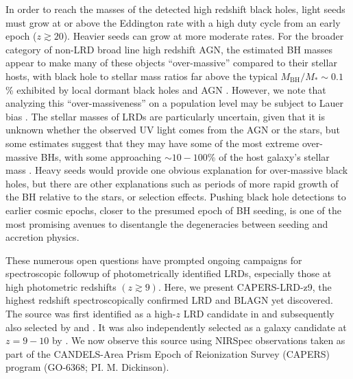 \documentclass[twocolumn]{aastex7}
\newcommand{\src}{CAPERS-LRD-z9}
\begin{document}
In order to reach the masses of the detected high redshift black holes, light seeds must grow at or above the Eddington rate with a high duty cycle from an early epoch ($z\gtrsim 20$). Heavier seeds can grow at more moderate rates. For the broader category of non-LRD broad line high redshift AGN, the estimated BH masses appear to make many of these objects ``over-massive'' compared to their stellar hosts, with black hole to stellar mass ratios far above the typical $M_{\textrm{BH}}/M_*\sim0.1$\% exhibited by local dormant black holes and AGN \citep{agarwal13,pacucci23}. However, we note that analyzing this ``over-massiveness'' on a population level may be subject to Lauer bias \citep[the tendency to observe a greater number of massive black holes as outliers in intrinsically common moderate mass galaxies, rather than in intrinsically rarer high-mass galaxies;][]{lauer07,lisilverman25}. The stellar masses of LRDs are particularly uncertain, given that it is unknown whether the observed UV light comes from the AGN or the stars, but some estimates suggest that they may have some of the most extreme over-massive BHs, with some approaching $\sim10-100$\% of the host galaxy's stellar mass \citep[e.g.][]{Maiolino_2023,kokorev23,kocevski25,Chen_2025}. Heavy seeds would provide one obvious explanation for over-massive black holes, but there are other explanations such as periods of more rapid growth of the BH relative to the stars, or selection effects. Pushing black hole detections to earlier cosmic epochs, closer to the presumed epoch of BH seeding, is one of the most promising avenues to disentangle the degeneracies between seeding and accretion physics. 

These numerous open questions have prompted ongoing campaigns for spectroscopic followup of photometrically identified LRDs, especially those at high photometric redshifts $(z\gtrsim9)$. Here, we present \src{}, the highest redshift spectroscopically confirmed LRD and BLAGN yet discovered. The source was first identified as a high-$z$ LRD candidate in \cite{kocevski25} and subsequently also selected by \cite{barro24b} and \cite{akins24}.  It was also independently selected as a galaxy candidate at $z = 9-10$ by \citet{donnan2024}.  We now observe this source using NIRSpec observations taken as part of the CANDELS-Area Prism Epoch of Reionization Survey (CAPERS) program (GO-6368; PI. M. Dickinson).
\end{document}
